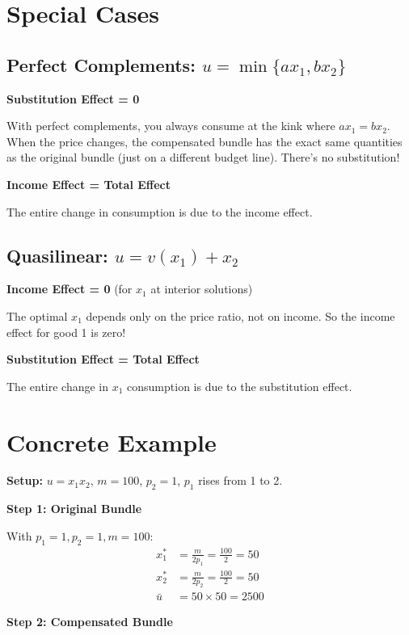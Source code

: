 \documentclass[12pt]{article}
\begin{document}
\section{Special Cases}

\subsection*{Perfect Complements: $u = \min\{ax_1, bx_2\}$}

\textbf{Substitution Effect = 0}

With perfect complements, you always consume at the kink where $ax_1 = bx_2$. When the price changes, the compensated bundle has the exact same quantities as the original bundle (just on a different budget line). There's no substitution!

\textbf{Income Effect = Total Effect}

The entire change in consumption is due to the income effect.

\subsection*{Quasilinear: $u = v(x_1) + x_2$}

\textbf{Income Effect = 0} (for $x_1$ at interior solutions)

The optimal $x_1$ depends only on the price ratio, not on income. So the income effect for good 1 is zero!

\textbf{Substitution Effect = Total Effect}

The entire change in $x_1$ consumption is due to the substitution effect.

\section{Concrete Example}

\textbf{Setup:} $u = x_1 x_2$, $m = 100$, $p_2 = 1$, $p_1$ rises from 1 to 2.

\textbf{Step 1: Original Bundle}

With $p_1 = 1, p_2 = 1, m = 100$:
\begin{align*}
x_1^* &= \frac{m}{2p_1} = \frac{100}{2} = 50 \\
x_2^* &= \frac{m}{2p_2} = \frac{100}{2} = 50 \\
\bar{u} &= 50 \times 50 = 2500
\end{align*}

\textbf{Step 2: Compensated Bundle}
\end{document}
